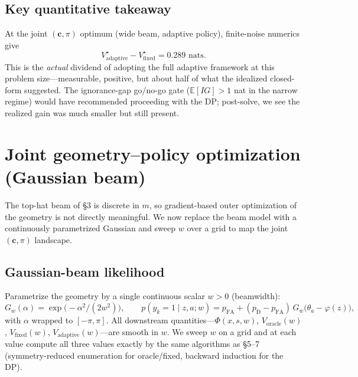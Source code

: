 \documentclass[11pt,a4paper]{article}
\newcommand{\E}{\mathbb{E}}
\begin{document}
\subsection{Key quantitative takeaway}

At the joint $(\bm{c}, \pi)$ optimum (wide beam, adaptive policy), finite-noise numerics give
\begin{equation}
  V_{\text{adaptive}}^\star - V_{\text{fixed}}^\star = 0.289 \text{ nats}.
\end{equation}
This is the \emph{actual} dividend of adopting the full adaptive framework at this problem size---measurable, positive, but about half of what the idealized closed-form suggested.  The ignorance-gap go/no-go gate ($\E[IG] > 1$ nat in the narrow regime) would have recommended proceeding with the DP; post-solve, we see the realized gain was much smaller but still present.

\section{Joint geometry--policy optimization (Gaussian beam)}
\label{sec:joint}

The top-hat beam of \S3 is discrete in $m$, so gradient-based outer optimization of the geometry is not directly meaningful.  We now replace the beam model with a continuously parametrized Gaussian and sweep $w$ over a grid to map the joint $(\bm{c}, \pi)$ landscape.

\subsection{Gaussian-beam likelihood}

Parametrize the geometry by a single continuous scalar $w > 0$ (beamwidth):
\begin{equation}
  G_w(\alpha) = \exp\!\bigl(-\alpha^2 / (2 w^2)\bigr),
  \qquad
  p(y_k = 1 \mid z, a; w)
  = p_{\mathrm{FA}} + (p_{\mathrm{D}} - p_{\mathrm{FA}})\, G_w\bigl(\theta_a - \varphi(z)\bigr),
\end{equation}
with $\alpha$ wrapped to $[-\pi, \pi]$.  All downstream quantities---$\Phi(x, s, w)$, $V_{\text{oracle}}(w)$, $V_{\text{fixed}}(w)$, $V_{\text{adaptive}}(w)$---are smooth in $w$.  We sweep $w$ on a grid and at each value compute all three values exactly by the same algorithms as \S5--7 (symmetry-reduced enumeration for oracle/fixed, backward induction for the DP).
\end{document}
